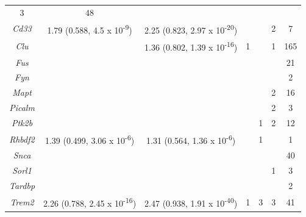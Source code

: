 \begin{landscape}
\begin{table}[]
\begin{threeparttable}
\begin{tabular}{@{}ccccccc@{}}
				3 &
				48 \\
				\textit{Cd33} &
				1.79 (0.588, 4.5 x 10\textsuperscript{-9}) &
				2.25 (0.823, 2.97 x 10\textsuperscript{-20}) &
				\cellcolor[HTML]{EFEFEF} &
				\cellcolor[HTML]{EFEFEF} &
				2 &
				7 \\
				\textit{Clu} &
				\cellcolor[HTML]{EFEFEF} &
				1.36 (0.802, 1.39 x 10\textsuperscript{-16}) &
				1 &
				\cellcolor[HTML]{EFEFEF} &
				1 &
				165 \\
				\textit{Fus} &
				\cellcolor[HTML]{EFEFEF} &
				\cellcolor[HTML]{EFEFEF} &
				\cellcolor[HTML]{EFEFEF} &
				\cellcolor[HTML]{EFEFEF} &
				\cellcolor[HTML]{EFEFEF} &
				21 \\
				\textit{Fyn} &
				\cellcolor[HTML]{EFEFEF} &
				\cellcolor[HTML]{EFEFEF} &
				\cellcolor[HTML]{EFEFEF} &
				\cellcolor[HTML]{EFEFEF} &
				\cellcolor[HTML]{EFEFEF} &
				2 \\
				\textit{Mapt} &
				\cellcolor[HTML]{EFEFEF} &
				\cellcolor[HTML]{EFEFEF} &
				\cellcolor[HTML]{EFEFEF} &
				\cellcolor[HTML]{EFEFEF} &
				2 &
				16 \\
				\textit{Picalm} &
				\cellcolor[HTML]{EFEFEF} &
				\cellcolor[HTML]{EFEFEF} &
				\cellcolor[HTML]{EFEFEF} &
				\cellcolor[HTML]{EFEFEF} &
				2 &
				3 \\
				\textit{Ptk2b} &
				\cellcolor[HTML]{EFEFEF} &
				\cellcolor[HTML]{EFEFEF} &
				\cellcolor[HTML]{EFEFEF} &
				1 &
				2 &
				12 \\
				\textit{Rhbdf2} &
				1.39 (0.499, 3.06 x 10\textsuperscript{-6}) &
				1.31 (0.564, 1.36 x 10\textsuperscript{-6}) &
				\cellcolor[HTML]{EFEFEF} &
				1 &
				\cellcolor[HTML]{EFEFEF} &
				1 \\
				\textit{Snca} &
				\cellcolor[HTML]{EFEFEF} &
				\cellcolor[HTML]{EFEFEF} &
				\cellcolor[HTML]{EFEFEF} &
				\cellcolor[HTML]{EFEFEF} &
				\cellcolor[HTML]{EFEFEF} &
				40 \\
				\textit{Sorl1} &
				\cellcolor[HTML]{EFEFEF} &
				\cellcolor[HTML]{EFEFEF} &
				\cellcolor[HTML]{EFEFEF} &
				\cellcolor[HTML]{EFEFEF} &
				1 &
				3 \\
				\textit{Tardbp} &
				\cellcolor[HTML]{EFEFEF} &
				\cellcolor[HTML]{EFEFEF} &
				\cellcolor[HTML]{EFEFEF} &
				\cellcolor[HTML]{EFEFEF} &
				\cellcolor[HTML]{EFEFEF} &
				2 \\
				\textit{Trem2} &
				2.26 (0.788, 2.45 x 10\textsuperscript{-16}) &
				2.47 (0.938, 1.91 x 10\textsuperscript{-40}) &
				1 &
				3 &
				3 &
				41 \\

\end{tabular}
\end{threeparttable}
\end{table}
\end{landscape}
